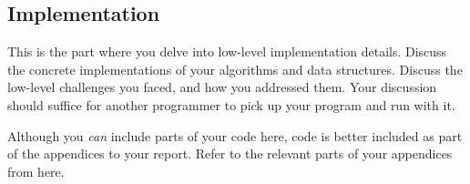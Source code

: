 \subsection{Implementation}

\label{sec:implementation}

This is the part where you delve into low-level implementation details. Discuss
the concrete implementations of your algorithms and data structures. Discuss
the low-level challenges you faced, and how you addressed them.  Your
discussion should suffice for another programmer to pick up your program and
run with it.

Although you \emph{can} include parts of your code here, code is better
included as part of the appendices to your report. Refer to the relevant parts
of your appendices from here.

